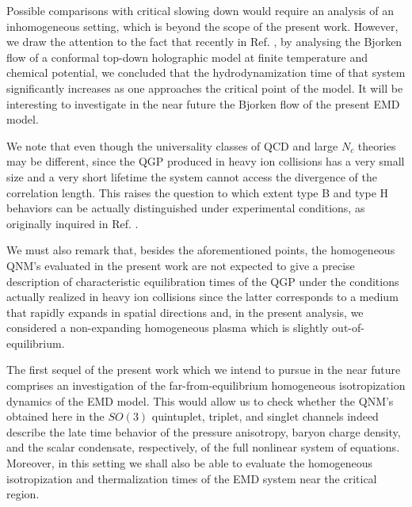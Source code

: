 \documentclass[aps,prd,showkeys,superscriptaddress,singlecolumn,nofootinbib,floatfix]{revtex4-1}
\begin{document}
Possible comparisons with critical slowing down \cite{Stephanov:2017ghc} would require an analysis of an inhomogeneous setting, which is beyond the scope of the present work. However, we draw the attention to the fact that recently in Ref. \cite{Critelli:2018osu}, by analysing the Bjorken flow \cite{Bjorken:1982qr} of a conformal top-down holographic model at finite temperature and chemical potential, we concluded that the hydrodynamization time of that system significantly increases as one approaches the critical point of the model. It will be interesting to investigate in the near future the Bjorken flow of the present EMD model.

We note that even though the universality classes of QCD and large $N_c$ theories may be different, since the QGP produced in heavy ion collisions has a very small size and a very short lifetime the system cannot access the divergence of the correlation length. This raises the question to which extent type B and type H behaviors can be actually distinguished under experimental conditions, as originally inquired in Ref. \cite{Natsuume:2010bs}.

We must also remark that, besides the aforementioned points, the homogeneous QNM's evaluated in the present work are not expected to give a precise description of characteristic equilibration times of the QGP under the conditions actually realized in heavy ion collisions since the latter corresponds to a medium that rapidly expands in spatial directions and, in the present analysis, we considered a non-expanding homogeneous plasma which is slightly out-of-equilibrium.


The first sequel of the present work which we intend to pursue in the near future comprises an investigation of the far-from-equilibrium homogeneous isotropization dynamics of the EMD model. This would allow us to check whether the QNM's obtained here in the $SO(3)$ quintuplet, triplet, and singlet channels indeed describe the late time behavior of the pressure anisotropy, baryon charge density, and the scalar condensate, respectively, of the full nonlinear system of equations. Moreover, in this setting we shall also be able to evaluate the homogeneous isotropization and thermalization times of the EMD system near the critical region.
\end{document}
